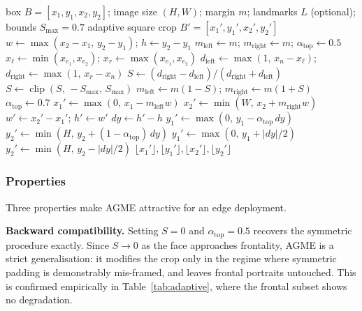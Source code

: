 \documentclass[journal]{IEEEtran}
\begin{document}
\begin{algorithm}[t]
\caption{Adaptive Gaze-Dependent Margin Expansion}
\label{alg:agme}
\begin{algorithmic}[1]
\REQUIRE box $B = [x_1,y_1,x_2,y_2]$; image size $(H,W)$; margin $m$; landmarks $L$ (optional); bounds $S_{\max}=0.7$
\ENSURE adaptive square crop $B' = [x_1',y_1',x_2',y_2']$
\STATE $w \leftarrow \max(x_2-x_1,\, y_2-y_1)$; \quad $h \leftarrow y_2-y_1$
\STATE $m_{\text{left}} \leftarrow m$; \quad $m_{\text{right}} \leftarrow m$; \quad $\alpha_{\text{top}} \leftarrow 0.5$
    \STATE $x_\ell \leftarrow \min(x_{e_1},x_{e_2})$; \quad $x_r \leftarrow \max(x_{e_1},x_{e_2})$
    \STATE $d_{\text{left}} \leftarrow \max(1,\, x_n - x_\ell)$; \quad $d_{\text{right}} \leftarrow \max(1,\, x_r - x_n)$
    \STATE $S \leftarrow (d_{\text{right}}-d_{\text{left}}) / (d_{\text{right}}+d_{\text{left}})$
    \STATE $S \leftarrow \operatorname{clip}(S,\, -S_{\max},\, S_{\max})$
    \STATE $m_{\text{left}} \leftarrow m(1-S)$; \quad $m_{\text{right}} \leftarrow m(1+S)$
    \STATE $\alpha_{\text{top}} \leftarrow 0.7$ 
\ENDIF
\STATE $x_1' \leftarrow \max(0,\, x_1 - m_{\text{left}} w)$
\STATE $x_2' \leftarrow \min(W,\, x_2 + m_{\text{right}} w)$
\STATE $w' \leftarrow x_2' - x_1'$; \quad $h' \leftarrow w'$ 
\STATE $dy \leftarrow h' - h$
    \STATE $y_1' \leftarrow \max(0,\, y_1 - \alpha_{\text{top}}\, dy)$
    \STATE $y_2' \leftarrow \min(H,\, y_2 + (1-\alpha_{\text{top}})\, dy)$
\ELSE
    \STATE $y_1' \leftarrow \max(0,\, y_1 + |dy|/2)$
    \STATE $y_2' \leftarrow \min(H,\, y_2 - |dy|/2)$
\ENDIF
\RETURN $\lfloor x_1' \rfloor, \lfloor y_1' \rfloor, \lfloor x_2' \rfloor, \lfloor y_2' \rfloor$
\end{algorithmic}
\end{algorithm}

\subsubsection{Properties}
Three properties make AGME attractive for an edge deployment.

\textbf{Backward compatibility.} Setting $S = 0$ and $\alpha_{\text{top}} = 0.5$ recovers the symmetric procedure exactly. Since $S \to 0$ as the face approaches frontality, AGME is a strict generalisation: it modifies the crop only in the regime where symmetric padding is demonstrably mis-framed, and leaves frontal portraits untouched. This is confirmed empirically in Table~\ref{tab:adaptive}, where the frontal subset shows no degradation.
\end{document}
